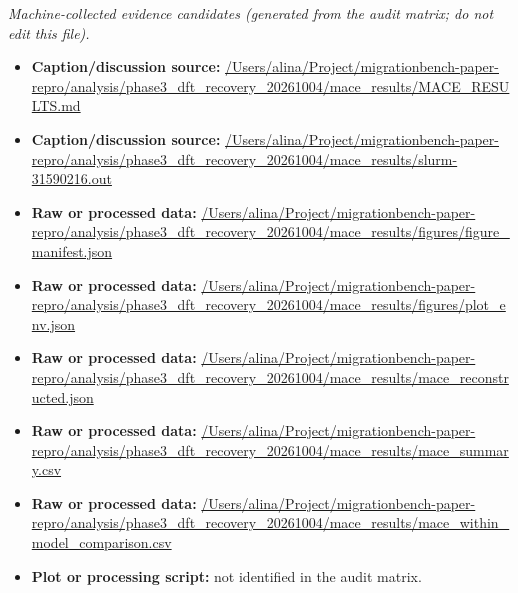 \emph{Machine-collected evidence candidates (generated from the audit matrix; do not edit this file).}
\begin{itemize}[leftmargin=1.4em,noitemsep]
\item \textbf{Caption/discussion source:} \url{/Users/alina/Project/migrationbench-paper-repro/analysis/phase3_dft_recovery_20261004/mace_results/MACE_RESULTS.md}
\item \textbf{Caption/discussion source:} \url{/Users/alina/Project/migrationbench-paper-repro/analysis/phase3_dft_recovery_20261004/mace_results/slurm-31590216.out}
\item \textbf{Raw or processed data:} \url{/Users/alina/Project/migrationbench-paper-repro/analysis/phase3_dft_recovery_20261004/mace_results/figures/figure_manifest.json}
\item \textbf{Raw or processed data:} \url{/Users/alina/Project/migrationbench-paper-repro/analysis/phase3_dft_recovery_20261004/mace_results/figures/plot_env.json}
\item \textbf{Raw or processed data:} \url{/Users/alina/Project/migrationbench-paper-repro/analysis/phase3_dft_recovery_20261004/mace_results/mace_reconstructed.json}
\item \textbf{Raw or processed data:} \url{/Users/alina/Project/migrationbench-paper-repro/analysis/phase3_dft_recovery_20261004/mace_results/mace_summary.csv}
\item \textbf{Raw or processed data:} \url{/Users/alina/Project/migrationbench-paper-repro/analysis/phase3_dft_recovery_20261004/mace_results/mace_within_model_comparison.csv}
\item \textbf{Plot or processing script:} not identified in the audit matrix.
\end{itemize}
